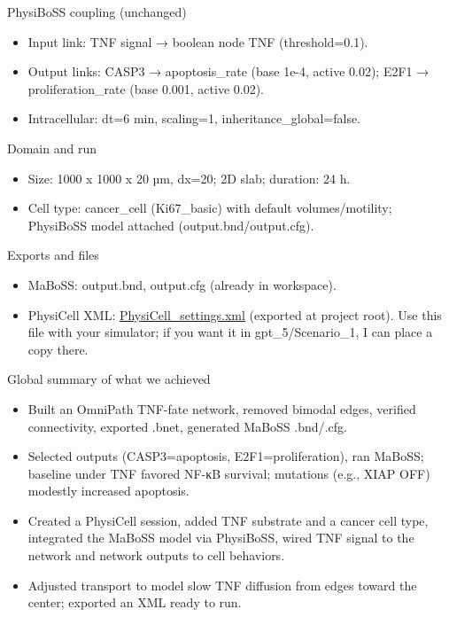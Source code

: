 PhysiBoSS coupling (unchanged)

\begin{itemize}
\tightlist
\item
  Input link: TNF signal → boolean node TNF (threshold=0.1).
\item
  Output links: CASP3 → apoptosis\_rate (base 1e-4, active 0.02); E2F1 →
  proliferation\_rate (base 0.001, active 0.02).
\item
  Intracellular: dt=6 min, scaling=1, inheritance\_global=false.
\end{itemize}

Domain and run

\begin{itemize}
\tightlist
\item
  Size: 1000 x 1000 x 20 µm, dx=20; 2D slab; duration: 24 h.
\item
  Cell type: cancer\_cell (Ki67\_basic) with default volumes/motility;
  PhysiBoSS model attached (output.bnd/output.cfg).
\end{itemize}

Exports and files

\begin{itemize}
\tightlist
\item
  MaBoSS: output.bnd, output.cfg (already in workspace).
\item
  PhysiCell XML:
  \href{vscode-file://vscode-app/usr/share/code/resources/app/out/vs/code/electron-browser/workbench/workbench.html}{PhysiCell\_settings.xml}
  (exported at project root). Use this file with your simulator; if you
  want it in gpt\_5/Scenario\_1, I can place a copy there.
\end{itemize}

Global summary of what we achieved

\begin{itemize}
\tightlist
\item
  Built an OmniPath TNF-fate network, removed bimodal edges, verified
  connectivity, exported .bnet, generated MaBoSS .bnd/.cfg.
\item
  Selected outputs (CASP3=apoptosis, E2F1=proliferation), ran MaBoSS;
  baseline under TNF favored NF-κB survival; mutations (e.g., XIAP OFF)
  modestly increased apoptosis.
\item
  Created a PhysiCell session, added TNF substrate and a cancer cell
  type, integrated the MaBoSS model via PhysiBoSS, wired TNF signal to
  the network and network outputs to cell behaviors.
\item
  Adjusted transport to model slow TNF diffusion from edges toward the
  center; exported an XML ready to run.
\end{itemize}

